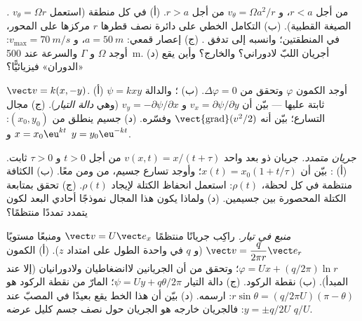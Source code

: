 \begin{exercise}[$\star\star$]\label{exo:b2:fluid-kinematics:8}
\emph{.} $v_\theta = \Omega r$ من أجل $r < a$، و $v_\theta = \Omega a^2/r$
من أجل $r > a$. (أ)  في كل منطقة (استعمل الصيغة
القطبية). (ب) التكامل الخطي على دائرة نصف قطرها $r$ مركزها على
المحور، في المنطقتين؛ وانسبه إلى تدفق . (ج) إعصار قمعي: $a = \qty{50}{m}$،
و $v_{\max} = \qty{70}{m/s}$: أوجد $\Omega$ و $\Gamma$ والسرعة عند \qty{500}{m}.
(د) أجريان اللبّ لادوراني؟ والخارج؟ وأين يقع «الدوران»
فيزيائيًّا؟
\end{exercise}

\begin{exercise}[$\star\star$]\label{exo:b2:fluid-kinematics:9}
\emph{} $\vect v = k(x, -y)$. (أ) أوجد الكمون $\varphi$
وتحقق من $\Delta\varphi = 0$. (ب) ؛ والدالة $\psi = kxy$
ثابتة عليها --- بيّن أن $v_x = \partial\psi/\partial y$ و $v_y = -\partial\psi/
\partial x$ (وهي \emph{دالة التيار}). (ج) مجال التسارع؛ بيّن أنه
$\operatorname{\vect{grad}}(v^2/2)$ وفسّره. (د)  جسيم ينطلق من
$(x_0, y_0)$: $x = x_0\eu^{kt}$ و $y = y_0\eu^{-kt}$.
\end{exercise}

\begin{exercise}[$\star\star\star$]\label{exo:b2:fluid-kinematics:10}
\emph{جريان متمدد.} جريان ذو بعد واحد $v(x, t) = x/(t + \tau)$
من أجل $t > 0$ و $\tau > 0$ ثابت. (أ) : بيّن أن $x(t) = x_0(1 +
t/\tau)$؛ وأوجد تسارع جسيم، من  ومن  معًا.
(ب) الكثافة منتظمة في كل لحظة، $\rho(t)$: استعمل انحفاظ الكتلة
لإيجاد $\rho(t)$. (ج) تحقق بمتابعة الكتلة المحصورة بين جسيمين.
(د) ولماذا يكون هذا المجال نموذجًا أحادي البعد لكون يتمدد
تمددًا منتظمًا؟
\end{exercise}

\begin{exercise}[$\star\star\star$]\label{exo:b2:fluid-kinematics:11}
\emph{منبع في تيار.} راكِب جريانًا منتظمًا $\vect v = U\vect e_x$
ومنبعًا مستويًا $\vect v = \dfrac{q}{2\pi r}\vect e_r$ (و $q$  في واحدة الطول على امتداد $z$). (أ) الكمون $\varphi = Ux +
(q/2\pi)\ln r$؛ وتحقق من أن الجريانين لاانضغاطيان ولادورانيان
(إلا عند المبدأ). (ب) نقطة الركود. (ج) دالة التيار $\psi
= Uy + q\theta/2\pi$؛  المارّ من نقطة الركود هو
$r\sin\theta = (q/2\pi U)(\pi - \theta)$: ارسمه. (د) بيّن أن هذا الخط
يقع بعيدًا في المصبّ عند $y = \pm q/2U$: فالجريان خارجه هو الجريان
حول نصف جسم كليل عرضه $q/U$.
\end{exercise}

